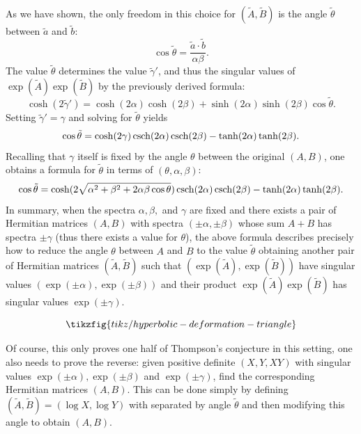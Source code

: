 \documentclass[notitlepage, 10pt]{article}
\begin{document}
As we have shown, the only freedom in this choice for $(\tilde A, \tilde B)$ is the angle $\tilde \theta$ between $\tilde a$ and $\tilde b$: 
\begin{equation}
    \cos \tilde \theta = \frac{\tilde a \cdot \tilde b}{\alpha \beta}.
\end{equation}
The value $\tilde \theta$ determines the value $\tilde \gamma'$, and thus the singular values of $\exp(\tilde A)\exp(\tilde B)$ by the previously derived formula:
\begin{equation}
    \cosh(2 \tilde \gamma') = \cosh(2 \alpha) \cosh(2 \beta) + \sinh (2\alpha) \sinh (2\beta)\cos \tilde \theta.
\end{equation}
Setting $\tilde \gamma' = \gamma$ and solving for $\tilde \theta$ yields
\begin{equation}
    \cos \tilde \theta = \cosh(2 \gamma)\operatorname{csch} (2\alpha) \operatorname{csch} (2\beta)-\tanh(2\alpha)\tanh(2\beta).
\end{equation}
Recalling that $\gamma$ itself is fixed by the angle $\theta$ between the original $(A,B)$, one obtains a formula for $\tilde \theta$ in terms of $(\theta, \alpha, \beta)$:
\begin{equation}
    \cos \tilde \theta = \cosh(2 \sqrt{\alpha^2+\beta^2+2\alpha\beta\cos \theta})\operatorname{csch} (2\alpha) \operatorname{csch} (2\beta)-\tanh(2\alpha)\tanh(2\beta).
\end{equation}
In summary, when the spectra $\alpha, \beta,$ and $\gamma$ are fixed and there exists a pair of Hermitian matrices $(A,B)$ with spectra $(\pm \alpha, \pm \beta)$ whose sum $A+B$ has spectra $\pm \gamma$ (thus there exists a value for $\theta$), the above formula describes precisely how to reduce the angle $\theta$ between $A$ and $B$ to the value $\tilde \theta$ obtaining another pair of Hermitian matrices $(\tilde A, \tilde B)$ such that $(\exp(\tilde A), \exp(\tilde B))$ have singular values $(\exp(\pm \alpha), \exp(\pm \beta))$ and their product $\exp(\tilde A)\exp(\tilde B)$ has singular values $\exp(\pm \gamma)$.

\begin{equation}
    \tikzfig{tikz/hyperbolic-deformation-triangle}
\end{equation}

Of course, this only proves one half of Thompson's conjecture in this setting, one also needs to prove the reverse: given positive definite $(X,Y, XY)$ with singular values $\exp(\pm\alpha),\exp(\pm\beta)$ and $\exp(\pm\gamma)$, find the corresponding Hermitian matrices $(A,B)$.
This can be done simply by defining $(\tilde A, \tilde B) = (\log X, \log Y)$ with separated by angle $\tilde \theta$ and then modifying this angle to obtain $(A, B)$.
\end{document}
